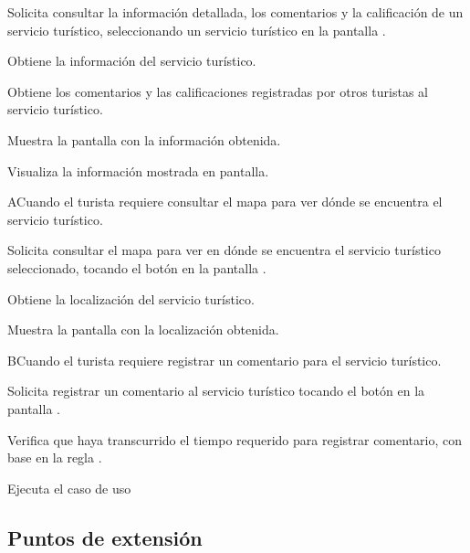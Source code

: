 	\begin{UCtrayectoria}
		 
		\UCpaso [\UCactor] Solicita consultar la información detallada, los comentarios y la calificación de un servicio turístico, seleccionando un servicio turístico en la pantalla .
		
		\UCpaso Obtiene la información del servicio turístico.
		
		\UCpaso Obtiene los comentarios y las calificaciones registradas por otros turistas al servicio turístico.
		
		\UCpaso \label{SE-CU2.1.2.1:Pantalla} Muestra la pantalla  con la información obtenida.
		
		\UCpaso [\UCactor] Visualiza la información mostrada en pantalla.   
	\end{UCtrayectoria}

	\begin{UCtrayectoriaA}{A}{Cuando el turista requiere consultar el mapa para ver dónde se encuentra el servicio turístico.}
		
		\UCpaso [\UCactor] Solicita consultar el mapa para ver en dónde se encuentra el servicio turístico seleccionado, tocando el botón  en la pantalla .
		
		\UCpaso Obtiene la localización del servicio turístico. 
		
		\UCpaso Muestra la pantalla  con la localización obtenida.
		
	\end{UCtrayectoriaA}

	\begin{UCtrayectoriaA}{B}{Cuando el turista requiere registrar un comentario para el servicio turístico.}
		
		\UCpaso [\UCactor] Solicita registrar un comentario al servicio turístico tocando el botón  en la pantalla .
		
		\UCpaso Verifica que haya transcurrido el tiempo requerido para registrar comentario, con base en la regla . 
		
		\UCpaso \label{SE-CU2.1.2.1:EjecutaCaso}Ejecuta el caso de uso 
		
	\end{UCtrayectoriaA}

	\subsection{Puntos de extensión}
	

